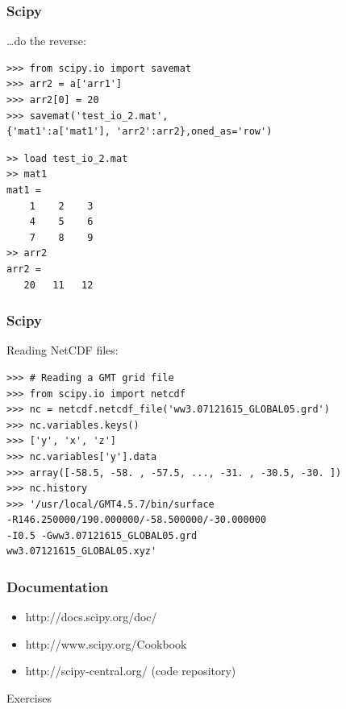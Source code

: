 \begin{frame}[fragile]
\frametitle{Scipy}
\ldots do the reverse:
\begin{myColorBox}{1.0}{}
\begin{verbatim}
>>> from scipy.io import savemat
>>> arr2 = a['arr1']
>>> arr2[0] = 20
>>> savemat('test_io_2.mat',
{'mat1':a['mat1'], 'arr2':arr2},oned_as='row')
\end{verbatim}
\end{myColorBox}
\pause
\begin{myColorBox}{1.0}{}
\begin{verbatim}
>> load test_io_2.mat
>> mat1
mat1 =
    1    2    3
    4    5    6
    7    8    9
>> arr2
arr2 =
   20   11   12
\end{verbatim}
\end{myColorBox}
\end{frame}

\begin{frame}[fragile]
\frametitle{Scipy}
Reading NetCDF files:
\begin{myColorBox}{1.0}{}
\begin{verbatim}
>>> # Reading a GMT grid file
>>> from scipy.io import netcdf
>>> nc = netcdf.netcdf_file('ww3.07121615_GLOBAL05.grd')
>>> nc.variables.keys()
>>> ['y', 'x', 'z']
>>> nc.variables['y'].data
>>> array([-58.5, -58. , -57.5, ..., -31. , -30.5, -30. ])
>>> nc.history
>>> '/usr/local/GMT4.5.7/bin/surface 
-R146.250000/190.000000/-58.500000/-30.000000 
-I0.5 -Gww3.07121615_GLOBAL05.grd 
ww3.07121615_GLOBAL05.xyz'
\end{verbatim}
\end{myColorBox}
\end{frame}

\begin{frame}[fragile]
\frametitle{Documentation}
\begin{itemize}
  \item http://docs.scipy.org/doc/
  \item http://www.scipy.org/Cookbook
  \item http://scipy-central.org/ (code repository)   
\end{itemize}
\end{frame}

\begin{frame}
\begin{center}
\Huge{Exercises}
\end{center}
\end{frame}

